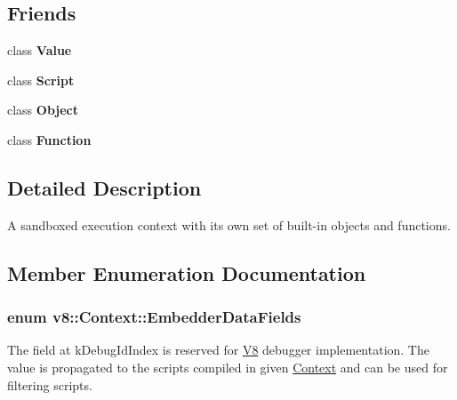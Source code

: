 \subsection*{Friends}
\begin{DoxyCompactItemize}
\item 
class {\bfseries Value}\hypertarget{classv8_1_1_context_aeceedf6e1a7d48a588516ce2b1983d6f}{}\label{classv8_1_1_context_aeceedf6e1a7d48a588516ce2b1983d6f}

\item 
class {\bfseries Script}\hypertarget{classv8_1_1_context_ae98eaa96d1b24e087f3c3e372fb09dce}{}\label{classv8_1_1_context_ae98eaa96d1b24e087f3c3e372fb09dce}

\item 
class {\bfseries Object}\hypertarget{classv8_1_1_context_a0720b5f434e636e22a3ed34f847eec57}{}\label{classv8_1_1_context_a0720b5f434e636e22a3ed34f847eec57}

\item 
class {\bfseries Function}\hypertarget{classv8_1_1_context_ab7194606aa12931e96f8f5448d418ed0}{}\label{classv8_1_1_context_ab7194606aa12931e96f8f5448d418ed0}

\end{DoxyCompactItemize}


\subsection{Detailed Description}
A sandboxed execution context with its own set of built-\/in objects and functions. 

\subsection{Member Enumeration Documentation}
\subsubsection[{\texorpdfstring{Embedder\+Data\+Fields}{EmbedderDataFields}}]{\setlength{\rightskip}{0pt plus 5cm}enum {\bf v8\+::\+Context\+::\+Embedder\+Data\+Fields}}\hypertarget{classv8_1_1_context_a8e8a8c567e2d193f25f1ec211db0b5f9}{}\label{classv8_1_1_context_a8e8a8c567e2d193f25f1ec211db0b5f9}
The field at k\+Debug\+Id\+Index is reserved for \hyperlink{classv8_1_1_v8}{V8} debugger implementation. The value is propagated to the scripts compiled in given \hyperlink{classv8_1_1_context}{Context} and can be used for filtering scripts. 

